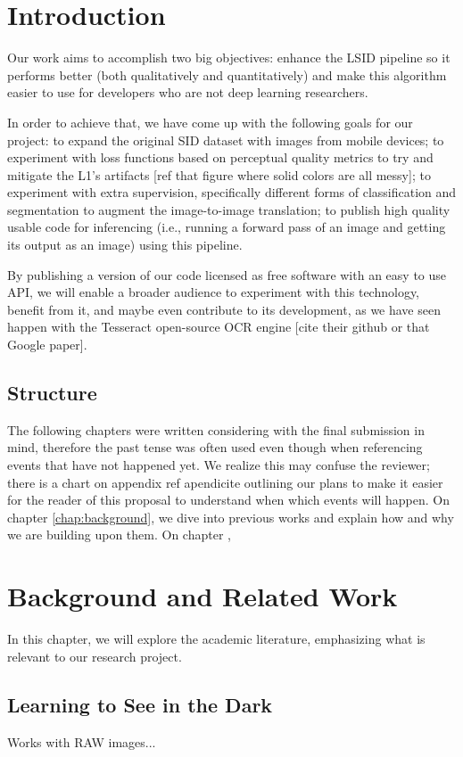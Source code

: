 \chapter{Introduction}
Our work aims to accomplish two big objectives:
enhance the LSID pipeline so it performs better (both qualitatively and quantitatively) and make this algorithm easier to use for developers who are not deep learning researchers.

In order to achieve that, we have come up with the following goals for our project:
to expand the original SID dataset with images from mobile devices;
to experiment with loss functions based on perceptual quality metrics to try and mitigate the L1's artifacts [ref that figure where solid colors are all messy];
to experiment with extra supervision, specifically different forms of classification and segmentation to augment the image-to-image translation;
to publish high quality usable code for inferencing (i.e., running a forward pass of an image and getting its output as an image) using this pipeline. 

By publishing a version of our code licensed as free software with an easy to use API, we will enable a broader audience to experiment with this technology, benefit from it, and maybe even contribute to its development, as we have seen happen with the Tesseract open-source OCR engine [cite their github or that Google paper].

\section{Structure}
The following chapters were written considering with the final submission in mind, therefore the past tense was often used even though when referencing events that have not happened yet.
We realize this may confuse the reviewer; there is a chart on appendix ref apendicite outlining our plans to make it easier for the reader of this proposal to understand when which events will happen.
On chapter \ref{chap:background}, we dive into previous works and explain how and why we are building upon them.
On chapter ,

\chapter{\label{chap:background}Background and Related Work}
In this chapter, we will explore the academic literature, emphasizing what is relevant to our research project. 

\section{Learning to See in the Dark}
Works with RAW images...

